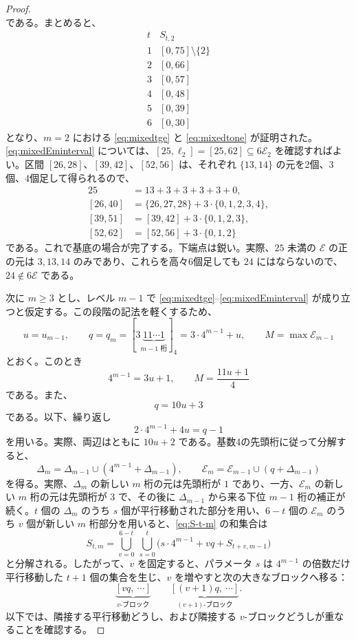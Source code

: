 \documentclass[12pt]{ltjsarticle}
\theoremstyle{plain}
\theoremstyle{definition}
\theoremstyle{plain}
\begin{document}
\begin{proof}
\[\]
である。まとめると、
\[
\begin{array}{c|c}
t&S_{t,2}\\ \hline
1&[0,75]\setminus\{2\}\\
2&[0,66]\\
3&[0,57]\\
4&[0,48]\\
5&[0,39]\\
6&[0,30]
\end{array}
\]
となり、$m=2$ における \eqref{eq:mixedtge} と \eqref{eq:mixedtone} が証明された。\eqref{eq:mixedEminterval} については、$[25,\ell_2]=[25,62]\subseteq6\mathcal E_2$ を確認すればよい。区間 $[26,28]$、$[39,42]$、$[52,56]$ は、それぞれ $\{13,14\}$ の元を2個、3個、4個足して得られるので、
\[
\begin{aligned}
25&=13+3+3+3+3+0,\\
[26,40]&=\{26,27,28\}+3\cdot\{0,1,2,3,4\},\\
[39,51]&=[39,42]+3\cdot\{0,1,2,3\},\\
[52,62]&=[52,56]+3\cdot\{0,1,2\}
\end{aligned}
\]
である。これで基底の場合が完了する。下端点は鋭い。実際、$25$ 未満の $\mathcal E$ の正の元は $3,13,14$ のみであり、これらを高々6個足しても $24$ にはならないので、$24\notin6\mathcal E$ である。

次に $m\geq3$ とし、レベル $m-1$ で \eqref{eq:mixedtge}--\eqref{eq:mixedEminterval} が成り立つと仮定する。この段階の記法を軽くするため、
\[
 u=u_{m-1},\qquad
 q=q_m=[3\underbrace{11\cdots1}_{m-1\text{ 桁}}]_4
      =3\cdot4^{m-1}+u,\qquad
 M=\max\mathcal E_{m-1}
\]
とおく。このとき
\[
 4^{m-1}=3u+1,\qquad
 M=\frac{11u+1}{4}
\]
である。また、
\begin{equation}\label{eq:qmdef}
 q=10u+3
\end{equation}
である。以下、繰り返し
\begin{equation}\label{eq:qoverlap}
 2\cdot4^{m-1}+4u=q-1
\end{equation}
を用いる。実際、両辺はともに $10u+2$ である。基数4の先頭桁に従って分解すると、
\[
 \Delta_m=\Delta_{m-1}\cup(4^{m-1}+\Delta_{m-1}),\qquad
 \mathcal E_m=\mathcal E_{m-1}\cup(q+\Delta_{m-1})
\]
を得る。実際、$\Delta_m$ の新しい $m$ 桁の元は先頭桁が $1$ であり、一方、$\mathcal E_m$ の新しい $m$ 桁の元は先頭桁が $3$ で、その後に $\Delta_{m-1}$ から来る下位 $m-1$ 桁の補正が続く。$t$ 個の $\Delta_m$ のうち $s$ 個が平行移動された部分を用い、$6-t$ 個の $\mathcal E_m$ のうち $v$ 個が新しい $m$ 桁部分を用いると、\eqref{eq:S-t-m} の和集合は
\begin{equation}\label{eq:decomp}
 S_{t,m}=\bigcup_{v=0}^{6-t}\ \bigcup_{s=0}^{t}
 \bigl(s\cdot4^{m-1}+vq+S_{t+v,m-1}\bigr)
\end{equation}
と分解される。したがって、$v$ を固定すると、パラメータ $s$ は $4^{m-1}$ の倍数だけ平行移動した $t+1$ 個の集合を生じ、$v$ を増やすと次の大きなブロックへ移る：
\[
 \underbrace{[vq,\ \cdots]}_{v\text{-ブロック}}
 \qquad
 \underbrace{[(v+1)q,\ \cdots]}_{(v+1)\text{-ブロック}}.
\]
以下では、隣接する平行移動どうし、および隣接する $v$-ブロックどうしが重なることを確認する。


\end{proof}
\end{document}
